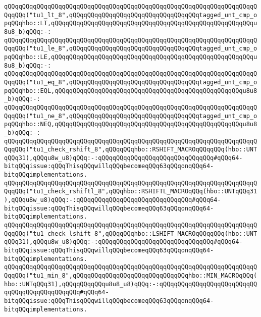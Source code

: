 \verb|qQQqqQQqqQQqqQQqqQQqqQQqqQQqqQQqqQQqqQQqqQQqqQQqqQQqqQQqqQQqqQQqqQQqqQQqqQQq("tu1_lt_8",qQQqqQQqqQQqqQQqqQQqqQQqqQQqqQQqqQQqtagged_unt_cmp_opqQQqhbo::LT,qQQqqQQqqQQqqQQqqQQqqQQqqQQqqQQqqQQqqQQqqQQqqQQqqQQqqQQqu8u8_b)qQQq:-:|\newline
\verb|qQQqqQQqqQQqqQQqqQQqqQQqqQQqqQQqqQQqqQQqqQQqqQQqqQQqqQQqqQQqqQQqqQQqqQQqqQQq("tu1_le_8",qQQqqQQqqQQqqQQqqQQqqQQqqQQqqQQqqQQqtagged_unt_cmp_opqQQqhbo::LE,qQQqqQQqqQQqqQQqqQQqqQQqqQQqqQQqqQQqqQQqqQQqqQQqqQQqqQQqu8u8_b)qQQq:-:|\newline
\verb|qQQqqQQqqQQqqQQqqQQqqQQqqQQqqQQqqQQqqQQqqQQqqQQqqQQqqQQqqQQqqQQqqQQqqQQqqQQq("tu1_eq_8",qQQqqQQqqQQqqQQqqQQqqQQqqQQqqQQqqQQqtagged_unt_cmp_opqQQqhbo::EQL,qQQqqQQqqQQqqQQqqQQqqQQqqQQqqQQqqQQqqQQqqQQqqQQqqQQqu8u8_b)qQQq:-:|\newline
\verb|qQQqqQQqqQQqqQQqqQQqqQQqqQQqqQQqqQQqqQQqqQQqqQQqqQQqqQQqqQQqqQQqqQQqqQQqqQQq("tu1_ne_8",qQQqqQQqqQQqqQQqqQQqqQQqqQQqqQQqqQQqtagged_unt_cmp_opqQQqhbo::NEQ,qQQqqQQqqQQqqQQqqQQqqQQqqQQqqQQqqQQqqQQqqQQqqQQqqQQqu8u8_b)qQQq:-:|\newline
\newline
\verb|qQQqqQQqqQQqqQQqqQQqqQQqqQQqqQQqqQQqqQQqqQQqqQQqqQQqqQQqqQQqqQQqqQQqqQQqqQQq("tu1_check_rshift_8",qQQqqQQqhbo::RSHIFT_MACROqQQqqQQq(hbo::UNTqQQq31),qQQqu8w_u8)qQQq:-:qQQqqQQqqQQqqQQqqQQqqQQqqQQqqQQq#qQQq64-bitqQQqissue:qQQqThisqQQqwillqQQqbecomeqQQq63qQQqonqQQq64-bitqQQqimplementations.|\newline
\verb|qQQqqQQqqQQqqQQqqQQqqQQqqQQqqQQqqQQqqQQqqQQqqQQqqQQqqQQqqQQqqQQqqQQqqQQqqQQq("tu1_check_rshiftl_8",qQQqhbo::RSHIFTL_MACROqQQq(hbo::UNTqQQq31),qQQqu8w_u8)qQQq:-:qQQqqQQqqQQqqQQqqQQqqQQqqQQqqQQq#qQQq64-bitqQQqissue:qQQqThisqQQqwillqQQqbecomeqQQq63qQQqonqQQq64-bitqQQqimplementations.|\newline
\verb|qQQqqQQqqQQqqQQqqQQqqQQqqQQqqQQqqQQqqQQqqQQqqQQqqQQqqQQqqQQqqQQqqQQqqQQqqQQq("tu1_check_lshift_8",qQQqqQQqhbo::LSHIFT_MACROqQQqqQQq(hbo::UNTqQQq31),qQQqu8w_u8)qQQq:-:qQQqqQQqqQQqqQQqqQQqqQQqqQQqqQQq#qQQq64-bitqQQqissue:qQQqThisqQQqwillqQQqbecomeqQQq63qQQqonqQQq64-bitqQQqimplementations.|\newline
\newline
\verb|qQQqqQQqqQQqqQQqqQQqqQQqqQQqqQQqqQQqqQQqqQQqqQQqqQQqqQQqqQQqqQQqqQQqqQQqqQQq("tu1_min_8",qQQqqQQqqQQqqQQqqQQqqQQqqQQqqQQqhbo::MIN_MACROqQQq(hbo::UNTqQQq31),qQQqqQQqqQQqu8u8_u8)qQQq:-:qQQqqQQqqQQqqQQqqQQqqQQqqQQqqQQqqQQqqQQqqQQqqQQq#qQQq64-bitqQQqissue:qQQqThisqQQqwillqQQqbecomeqQQq63qQQqonqQQq64-bitqQQqimplementations.|\newline
